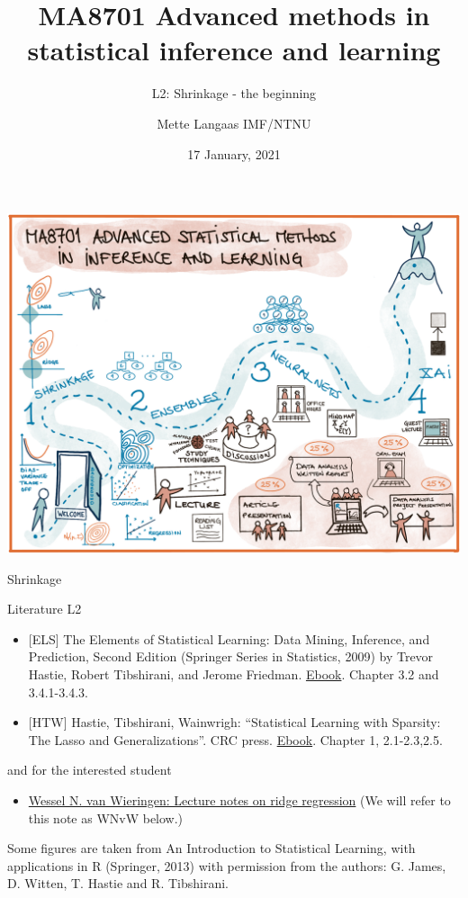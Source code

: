 \documentclass[
  ignorenonframetext,
]{beamer}
\title{MA8701 Advanced methods in statistical inference and learning}
\subtitle{L2: Shrinkage - the beginning}
\author{Mette Langaas IMF/NTNU}
\date{17 January, 2021}
\providecommand{\tightlist}{%
  \setlength{\itemsep}{0pt}\setlength{\parskip}{0pt}}
\begin{document}
\frame{\titlepage}

\begin{frame}

\includegraphics{../overviewv2.png}

\end{frame}

\begin{frame}{Shrinkage}
\protect\hypertarget{shrinkage}{}

\begin{block}{Literature L2}

\begin{itemize}
\item
  {[}ELS{]} The Elements of Statistical Learning: Data Mining,
  Inference, and Prediction, Second Edition (Springer Series in
  Statistics, 2009) by Trevor Hastie, Robert Tibshirani, and Jerome
  Friedman.
  \href{https://web.stanford.edu/~hastie/Papers/ESLII.pdf}{Ebook}.
  Chapter 3.2 and 3.4.1-3.4.3.
\item
  {[}HTW{]} Hastie, Tibshirani, Wainwrigh: ``Statistical Learning with
  Sparsity: The Lasso and Generalizations''. CRC press.
  \href{https://trevorhastie.github.io/}{Ebook}. Chapter 1, 2.1-2.3,2.5.
\end{itemize}

and for the interested student

\begin{itemize}
\tightlist
\item
  \href{https://arxiv.org/pdf/1509.09169.pdf}{Wessel N. van Wieringen:
  Lecture notes on ridge regression} (We will refer to this note as WNvW
  below.)
\end{itemize}

Some figures are taken from An Introduction to Statistical Learning,
with applications in R (Springer, 2013) with permission from the
authors: G. James, D. Witten, T. Hastie and R. Tibshirani.

\end{block}

\end{frame}
\end{document}
